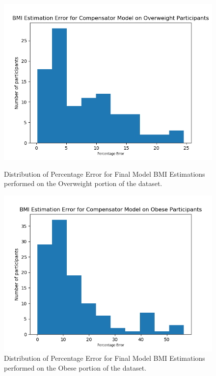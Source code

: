 \documentclass[conference]{IEEEtran}
\begin{document}
\begin{figure}[H]
    \centering
    \begin{minipage}[b]{0.35\textwidth}
    \includegraphics[width=\linewidth]{compovererror.png}
    \caption{Distribution of Percentage Error for Final Model BMI Estimations performed on the Overweight portion of the dataset.}
    \label{fig:compovererror}
    \end{minipage}
    \hspace{1cm}
    \begin{minipage}[b]{0.35\textwidth}
    \includegraphics[width=\linewidth]{compobeseerror.png}
    \caption{Distribution of Percentage Error for Final Model BMI Estimations performed on the Obese portion of the dataset.}
    \label{fig:compobeseerror}
    \end{minipage}
\end{figure}
\end{document}
